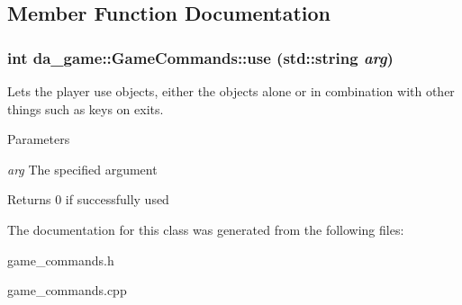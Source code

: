\subsection{Member Function Documentation}
\hypertarget{classda__game_1_1GameCommands_a3885d4f3da832d4c06c46f2ad4d14013}{
\subsubsection[{use}]{\setlength{\rightskip}{0pt plus 5cm}int da\_\-game::GameCommands::use (std::string {\em arg})}}
\label{classda__game_1_1GameCommands_a3885d4f3da832d4c06c46f2ad4d14013}
Lets the player use objects, either the objects alone or in combination with other things such as keys on exits.


\begin{DoxyParams}{Parameters}
\item[{\em arg}]The specified argument \end{DoxyParams}
\begin{DoxyReturn}{Returns}
0 if successfully used 
\end{DoxyReturn}


The documentation for this class was generated from the following files:\begin{DoxyCompactItemize}
\item 
game\_\-commands.h\item 
game\_\-commands.cpp\end{DoxyCompactItemize}
